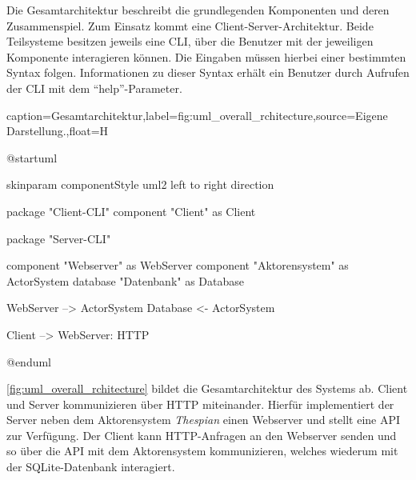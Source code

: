 Die Gesamtarchitektur beschreibt die grundlegenden Komponenten und deren Zusammenspiel.
Zum Einsatz kommt eine Client-Server-Architektur.
Beide Teilsysteme besitzen jeweils eine \ac{CLI}, über die Benutzer mit der jeweiligen Komponente interagieren können.
Die Eingaben müssen hierbei einer bestimmten Syntax folgen.
Informationen zu dieser Syntax erhält ein Benutzer durch Aufrufen der \ac{CLI} mit dem \enquote{help}-Parameter.

\begin{dhbwfigure}{caption=Gesamtarchitektur,label=fig:uml_overall_rchitecture,source={Eigene Darstellung.},float=H}
    \begin{plantuml}
        @startuml

            skinparam componentStyle uml2
            left to right direction

            package "Client-CLI" {
                component "Client" as Client
            }

            package "Server-CLI" {
                component "Webserver" as WebServer
                component "Aktorensystem" as ActorSystem
                database "Datenbank" as Database

                WebServer --> ActorSystem
                Database <- ActorSystem
            }

            Client --> WebServer: HTTP

        @enduml
    \end{plantuml}
\end{dhbwfigure}\unskip

\autoref{fig:uml_overall_rchitecture} bildet die Gesamtarchitektur des Systems ab.
Client und Server kommunizieren über \ac{HTTP} miteinander.
Hierfür implementiert der Server neben dem Aktorensystem \textit{Thespian} einen Webserver und stellt eine \ac{API} zur Verfügung. 
Der Client kann \ac{HTTP}-Anfragen an den Webserver senden und so über die \ac{API} mit dem Aktorensystem kommunizieren, welches wiederum mit der SQLite-Datenbank interagiert. 

